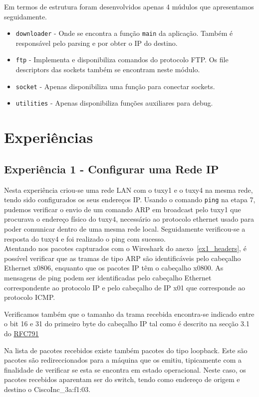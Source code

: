 \documentclass[11pt,a4paper,reqno]{report}
\numberwithin{equation}{section}
\begin{document}
Em termos de estrutura foram desenvolvidos apenas 4 múdulos que apresentamos seguidamente.
\begin{itemize} 
\item \verb|downloader| - Onde se encontra a função \verb|main| da aplicação. Também é responsável pelo parsing e por obter o IP do destino.
\item \verb|ftp| -  Implementa e disponibiliza comandos do protocolo FTP. Os file descriptors das sockets também se encontram neste módulo.
\item \verb|socket| - Apenas disponibiliza uma função para conectar sockets.
\item \verb|utilities| - Apenas disponibiliza funções auxiliares para debug.
\end{itemize}

\chapter{Experiências}

\section{Experiência 1 - Configurar uma Rede IP}

Nesta experiência criou-se uma rede LAN com o tuxy1 e o tuxy4 na mesma rede, tendo sido configurados os seus endereços IP. Usando o comando \verb|ping| na etapa 7, pudemos verificar o envio de um comando ARP em broadcast pelo tuxy1 que procurava o endereço físico do tuxy4, necessário ao protocolo ethernet usado para poder comunicar dentro de uma mesma rede local. Seguidamente verificou-se a resposta do tuxy4 e foi realizado o ping com sucesso.\\

Atentando nos pacotes capturados com o Wireshark do anexo~\ref{ex1_headers}, é possível verificar que as tramas de tipo ARP são identificáveis pelo cabeçalho Ethernet x0806, enquanto que os pacotes IP têm o cabeçalho x0800. As mensagens de ping podem ser identificadas pelo cabeçalho Ethernet correspondente ao protocolo IP e pelo cabeçalho de IP x01 que corresponde ao protocolo ICMP.

Verificamos também que o tamanho da trama recebida encontra-se indicado entre o bit 16 e 31 do primeiro byte do cabeçalho IP tal como é descrito na secção 3.1 do \href{https://www.ietf.org/rfc/rfc791.txt}{RFC791}

Na lista de pacotes recebidos existe também pacotes do tipo loopback. Este são pacotes são redireccionados para a máquina que os emitiu, tipicamente com a finalidade de verificar se esta se encontra em estado operacional. Neste caso, os pacotes recebidos aparentam ser do switch, tendo como endereço de origem e destino o CiscoInc\_3a:f1:03.
\end{document}
